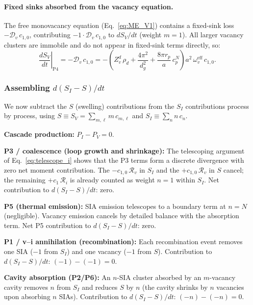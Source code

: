 \paragraph{Fixed sinks absorbed from the vacancy equation.}
The free monovacancy equation (Eq.~\ref{eq:ME_V1}) contains a fixed-sink
loss $-\mathcal{D}_v\,c_{1,0}$, contributing $-1 \cdot \mathcal{D}_v
\,c_{1,0}$ to $dS_V/dt$ (weight $m=1$). All larger vacancy clusters are
immobile and do not appear in fixed-sink terms directly, so:
\begin{equation}\label{eq:P4_SV}
    \left.\frac{dS_V}{dt}\right|_{\mathrm{P4}}
    = -\mathcal{D}_v\,c_{1,0}
    = -\left(Z_v^d\,\rho_d + \frac{4\pi^2}{d_g^2}
      + \frac{8\pi r_p}{a}\,c_p^N\right) a^2\,\omega_v^{\mathrm{eff}}\,c_{1,0}.
\end{equation}

\subsubsection*{Assembling $d(S_I - S)/dt$}

We now subtract the $S$ (swelling) contributions from the $S_I$
contributions process by process, using $S \equiv S_V =
\sum_{m,\ell} m\,c_{m,\ell}$ and $S_I \equiv \sum_n n\,c_n$.

\textbf{Cascade production:} $P_I - P_V = 0$. \checkmark

\textbf{P3 / coalescence (loop growth and shrinkage):}
The telescoping argument of Eq.~\eqref{eq:telescope_i} shows that the
P3 terms form a discrete divergence with zero net moment contribution.
The $-c_{1,0}\,\mathcal{R}_v$ in $S_I$ and the $+c_{1,0}\,\mathcal{R}_v$
in $S$ cancel; the remaining $+c_1\,\mathcal{R}_i$ is already counted as
weight $n=1$ within $S_I$. Net contribution to $d(S_I - S)/dt$: zero.
\checkmark

\textbf{P5 (thermal emission):}
SIA emission telescopes to a boundary term at $n=N$ (negligible). Vacancy
emission cancels by detailed balance with the absorption term. Net P5
contribution to $d(S_I - S)/dt$: zero. \checkmark

\textbf{P1 / v--i annihilation (recombination):}
Each recombination event removes one SIA ($-1$ from $S_I$) and one
vacancy ($-1$ from $S$). Contribution to $d(S_I - S)/dt$:
$(-1) - (-1) = 0$. \checkmark

\textbf{Cavity absorption (P2/P6):}
An $n$-SIA cluster absorbed by an $m$-vacancy cavity removes $n$ from
$S_I$ and reduces $S$ by $n$ (the cavity shrinks by $n$ vacancies upon
absorbing $n$ SIAs). Contribution to $d(S_I - S)/dt$: $(-n) - (-n) = 0$.
\checkmark

